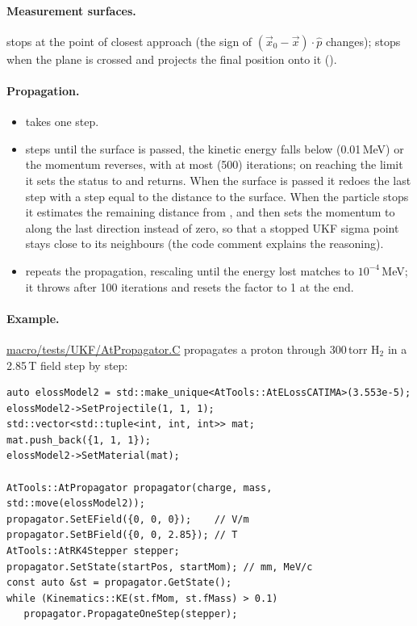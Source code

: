 \paragraph{Measurement surfaces.}
 stops at the point of closest approach (the sign of $(\vec x_0-\vec x)\cdot\hat p$
changes);  stops when the plane is crossed and projects the final
position onto it ().

\paragraph{Propagation.}
\begin{itemize}
\item {} takes one step.
\item {} steps until the surface is passed, the kinetic energy
  falls below  (0.01\,MeV) or the momentum reverses, with at most  (500)
  iterations; on reaching the limit it sets the status to  and returns. When the surface is passed it
  redoes the last step with a step equal to the distance to the surface. When the particle stops it estimates the
  remaining distance from \dedx{}, and then sets the momentum to  along the last direction instead of
  zero, so that a stopped UKF sigma point stays close to its neighbours (the code comment explains the reasoning).
\item {} repeats the propagation, rescaling
   until the energy lost matches  to $10^{-4}$\,MeV; it throws
   after 100 iterations and resets the factor to 1 at the end.
\end{itemize}

\paragraph{Example.}
\url{macro/tests/UKF/AtPropagator.C} propagates a proton through 300\,torr H$_2$ in a 2.85\,T field step by step:
\begin{verbatim}
auto elossModel2 = std::make_unique<AtTools::AtELossCATIMA>(3.553e-5);
elossModel2->SetProjectile(1, 1, 1);
std::vector<std::tuple<int, int, int>> mat;
mat.push_back({1, 1, 1});
elossModel2->SetMaterial(mat);

AtTools::AtPropagator propagator(charge, mass, std::move(elossModel2));
propagator.SetEField({0, 0, 0});    // V/m
propagator.SetBField({0, 0, 2.85}); // T
AtTools::AtRK4Stepper stepper;
propagator.SetState(startPos, startMom); // mm, MeV/c
const auto &st = propagator.GetState();
while (Kinematics::KE(st.fMom, st.fMass) > 0.1)
   propagator.PropagateOneStep(stepper);
\end{verbatim}

